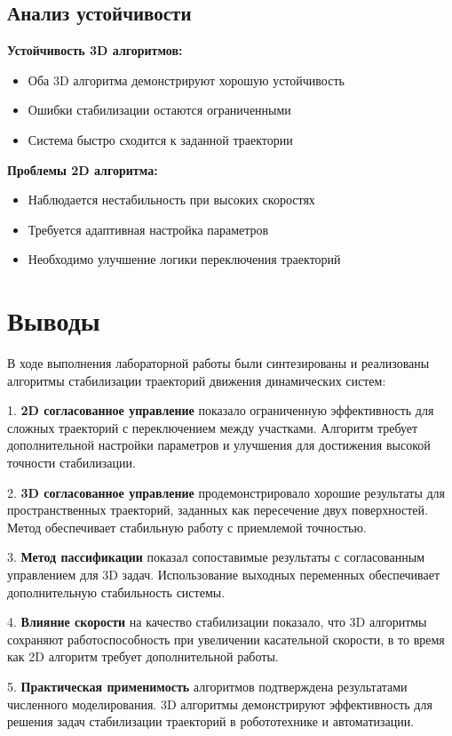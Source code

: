 \subsection{Анализ устойчивости}

\textbf{Устойчивость 3D алгоритмов:}
\begin{itemize}
\item Оба 3D алгоритма демонстрируют хорошую устойчивость
\item Ошибки стабилизации остаются ограниченными
\item Система быстро сходится к заданной траектории
\end{itemize}

\textbf{Проблемы 2D алгоритма:}
\begin{itemize}
\item Наблюдается нестабильность при высоких скоростях
\item Требуется адаптивная настройка параметров
\item Необходимо улучшение логики переключения траекторий
\end{itemize}

\section{Выводы}

В ходе выполнения лабораторной работы были синтезированы и реализованы алгоритмы стабилизации траекторий движения динамических систем:

1. \textbf{2D согласованное управление} показало ограниченную эффективность для сложных траекторий с переключением между участками. Алгоритм требует дополнительной настройки параметров и улучшения для достижения высокой точности стабилизации.

2. \textbf{3D согласованное управление} продемонстрировало хорошие результаты для пространственных траекторий, заданных как пересечение двух поверхностей. Метод обеспечивает стабильную работу с приемлемой точностью.

3. \textbf{Метод пассификации} показал сопоставимые результаты с согласованным управлением для 3D задач. Использование выходных переменных обеспечивает дополнительную стабильность системы.

4. \textbf{Влияние скорости} на качество стабилизации показало, что 3D алгоритмы сохраняют работоспособность при увеличении касательной скорости, в то время как 2D алгоритм требует дополнительной работы.

5. \textbf{Практическая применимость} алгоритмов подтверждена результатами численного моделирования. 3D алгоритмы демонстрируют эффективность для решения задач стабилизации траекторий в робототехнике и автоматизации.

